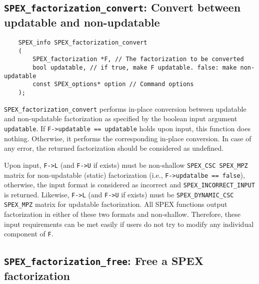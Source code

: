 \documentclass[12pt]{report}
\theoremstyle{definition}
\begin{document}
\subsection{\texttt{SPEX\_factorization\_convert}: Convert between updatable and non-updatable}\label{ss:spex_factorization_convert}

\begin{mdframed}[userdefinedwidth=6in]
{\footnotesize
\begin{verbatim}
    SPEX_info SPEX_factorization_convert
    (
        SPEX_factorization *F, // The factorization to be converted
        bool updatable, // if true, make F updatable. false: make non-updatable
        const SPEX_options* option // Command options
    ); 
\end{verbatim}
} \end{mdframed}


\verb|SPEX_factorization_convert| performs in-place conversion between updatable and
non-updatable factorization  as specified by the boolean
input argument \verb'updatable'. If \verb|F->updatable == updatable| holds upon input,
this function does nothing. Otherwise, it performs the corresponding
in-place conversion. In case of any error, the returned factorization should be considered as
undefined.

Upon input, \verb|F->L| (and \verb|F->U| if exists) must be non-shallow \verb|SPEX_CSC SPEX_MPZ| matrix for
non-updatable (static) factorization (i.e., \verb|F->updatalbe == false|),
otherwise, the input format is considered as incorrect and \verb|SPEX_INCORRECT_INPUT| is returned. Likewise, \verb|F->L| (and \verb|F->U|
if exists) must be \verb|SPEX_DYNAMIC_CSC SPEX_MPZ| matrix for updatable factorization. All
SPEX functions output factorization in either of these two formats and
non-shallow. Therefore, these input requirements can be met easily if users
do not try to modify any individual component of \verb|F|.




\subsection{\texttt{SPEX\_factorization\_free}: Free a SPEX factorization} \label{ss:spex_factorization_free}
\end{document}
